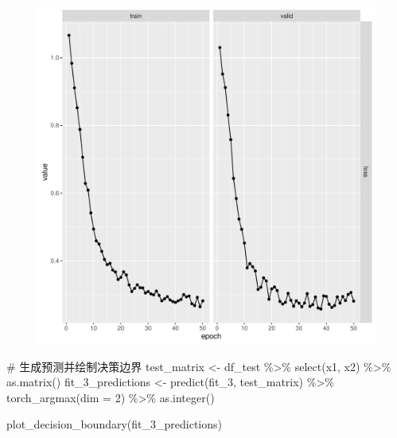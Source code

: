 \documentclass[
  letterpaper,
  DIV=11,
  numbers=noendperiod]{scrartcl}
\newenvironment{Shaded}{\begin{snugshade}}{\end{snugshade}}
\newcommand{\AttributeTok}[1]{\textcolor[rgb]{0.40,0.45,0.13}{#1}}
\newcommand{\CommentTok}[1]{\textcolor[rgb]{0.37,0.37,0.37}{#1}}
\newcommand{\DecValTok}[1]{\textcolor[rgb]{0.68,0.00,0.00}{#1}}
\newcommand{\FunctionTok}[1]{\textcolor[rgb]{0.28,0.35,0.67}{#1}}
\newcommand{\NormalTok}[1]{\textcolor[rgb]{0.00,0.23,0.31}{#1}}
\newcommand{\OtherTok}[1]{\textcolor[rgb]{0.00,0.23,0.31}{#1}}
\newcommand{\SpecialCharTok}[1]{\textcolor[rgb]{0.37,0.37,0.37}{#1}}
\begin{document}
\begin{figure}[H]

{\centering \includegraphics{hw5_files/figure-pdf/unnamed-chunk-37-1.pdf}

}

\end{figure}

\begin{Shaded}
\begin{Highlighting}[]
\CommentTok{\# 生成预测并绘制决策边界}
\NormalTok{test\_matrix }\OtherTok{\textless{}{-}}\NormalTok{ df\_test }\SpecialCharTok{\%\textgreater{}\%} \FunctionTok{select}\NormalTok{(x1, x2) }\SpecialCharTok{\%\textgreater{}\%} \FunctionTok{as.matrix}\NormalTok{()}
\NormalTok{fit\_3\_predictions }\OtherTok{\textless{}{-}} \FunctionTok{predict}\NormalTok{(fit\_3, test\_matrix) }\SpecialCharTok{\%\textgreater{}\%}
  \FunctionTok{torch\_argmax}\NormalTok{(}\AttributeTok{dim =} \DecValTok{2}\NormalTok{) }\SpecialCharTok{\%\textgreater{}\%}
  \FunctionTok{as.integer}\NormalTok{()}

\FunctionTok{plot\_decision\_boundary}\NormalTok{(fit\_3\_predictions)}
\end{Highlighting}
\end{Shaded}
\end{document}
